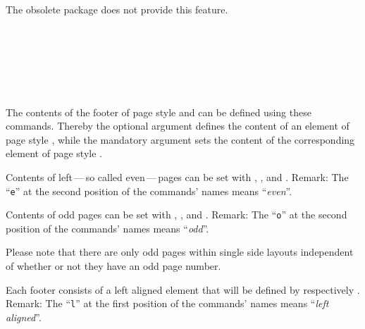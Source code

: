 The obsolete package  does not
provide this feature.%
%
%
%
%
%
%
%


\begin{Declaration}
                \\
                \\
                \\
                \\
                \\
\end{Declaration}
%
%
%
%
%
%
The contents of the footer of page style  and
 can be defined using these commands. Thereby the
optional argument defines the content of an element of page style
, while the mandatory argument sets the content
of the corresponding element of page style .

Contents of left\,---\,so called even\,---\,pages can be set with
, , and . Remark: The ``\texttt{e}''
at the second position of the commands' names means ``\emph{even}''.

Contents of odd pages can be set with , , and
. Remark: The ``\texttt{o}'' at the second position of the
commands' names means ``\emph{odd}''.

Please note that there are only odd pages within single
side layouts independent of whether or not they have an odd page number.

Each footer consists of a left aligned element that will be defined by
 respectively . Remark: The ``\texttt{l}'' at the
first position of the commands' names means ``\emph{left aligned}''.

